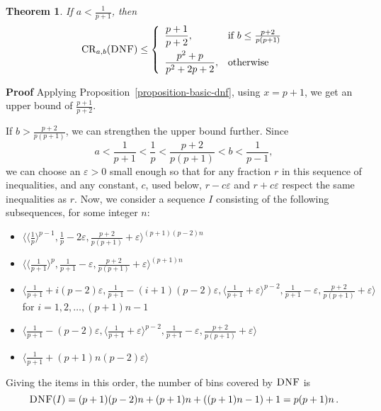 \documentclass[11pt]{article}
\newtheorem{xtheorem}{Theorem}
\newenvironment{theorem}{\begin{xtheorem}\rm}{\end{xtheorem}}
\newenvironment{proof}{\begin{trivlist}\item[]{\bf Proof }}{\hspace*{\fill}\raisebox{-1pt}{\boldmath$\Box$}\end{trivlist}}
\newcommand{\DNF}{\ensuremath{\operatorname{\textsc{DNF}}}\xspace}
\newcommand{\SEQ}[1]{\langle #1 \rangle}
\newcommand{\CRab}[1]{\ensuremath{\mathrm{CR}_{a,b}(#1)}\xspace}
\newcommand{\p}{p}
\newcommand{\eps}{\ensuremath{\varepsilon}\xspace}
\begin{document}
\begin{theorem}\label{lemma-DNF-3int-small}
If $a < \frac{1}{\p + 1} $, then
\[
\CRab{\DNF} \leq
\left\{
\begin{array}{ll}
  \displaystyle
  \frac{\p+1}{\p+2},          & 
  \displaystyle
  \mbox{if $b \leq \frac{\p+2}{\p(\p+1)}$} \\[2ex]
  \displaystyle
  \frac{\p^2+\p}{\p^2+2\p+2}, & 
  \displaystyle
  \mbox{otherwise}
\end{array}
\right.
\]
\end{theorem}
\begin{proof}
Applying Proposition~\ref{proposition-basic-dnf}, using $x=\p+1$,
we get an upper bound of $\frac{\p+1}{\p+2}$.

If $b > \frac{\p+2}{\p(\p+1)}$, we can strengthen the upper bound further.
Since
\[a < \frac{1}{\p+1} < \frac{1}{\p} < \frac{\p+2}{\p(\p+1)} < b < \frac{1}{\p-1},\]
we can choose an $\eps>0$ small enough so that for any fraction $r$ in this
sequence of inequalities, and any constant, $c$, used below,
$r-c\eps$ and $r+c\eps$ respect the same inequalities as $r$.
Now, we consider a sequence $I$ consisting of the following subsequences,
for some integer $n$:
 \begin{itemize}
  \item $\displaystyle \SEQ{ \SEQ{\frac{1}{\p}}^{\p-1},\frac{1}{\p}-2\varepsilon,\frac{\p+2}{\p(\p+1)}+\varepsilon }^{(\p+1)(\p-2)n}$ 
  \item $\displaystyle \SEQ{ \SEQ{\frac{1}{\p+1}}^{\p},\frac{1}{\p+1}-\varepsilon,\frac{\p+2}{\p(\p+1)}+\varepsilon}^{(p+1)n}$
  \item $\displaystyle \SEQ{ \frac{1}{\p+1} + i(\p-2)\varepsilon, \frac{1}{\p+1} - (i+1)(\p-2)\varepsilon, \SEQ{\frac{1}{\p+1}+\varepsilon}^{\p-2},
 \frac{1}{\p+1}-\varepsilon,\frac{\p+2}{\p(\p+1)}+\varepsilon}$
 for $i=1,2,\dots,(\p+1)n-1$
  \item $\displaystyle \SEQ{ \frac{1}{\p+1} - (\p-2)\varepsilon, \SEQ{\frac{1}{\p+1}+\varepsilon}^{\p-2},\frac{1}{\p+1}-\varepsilon,\frac{\p+2}{\p(\p+1)}+\varepsilon}$
  \item $\displaystyle \SEQ{ \frac{1}{\p+1}+ (\p+1)n(\p-2)\varepsilon}$
 \end{itemize}
Giving the items in this order, the number of bins covered by \DNF is
$$\DNF(I) = (\p+1)(\p-2)n+(\p+1)n+((\p+1)n-1)+1=\p(\p+1)n\,.$$


\end{proof}
\end{document}
